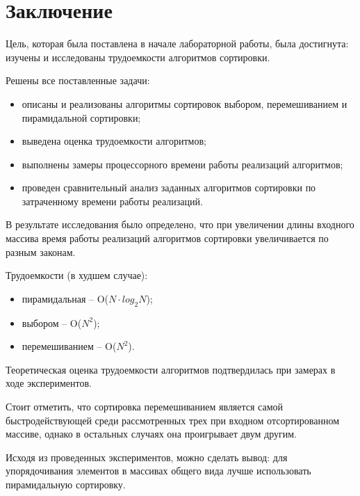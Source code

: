 \chapter*{Заключение}

Цель, которая была поставлена в начале лабораторной работы, была достигнута: изучены и исследованы трудоемкости алгоритмов сортировки.

Решены все поставленные задачи:

\begin{itemize}[label=---]
	\item описаны и реализованы алгоритмы сортировок выбором, перемешиванием и пирамидальной сортировки;
	\item выведена оценка трудоемкости алгоритмов;
    \item выполнены замеры процессорного времени работы реализаций алгоритмов;
	\item проведен сравнительный анализ заданных алгоритмов сортировки по затраченному времени работы реализаций.
\end{itemize}

В результате исследования было определено, что при увеличении длины входного массива время работы реализаций алгоритмов сортировки увеличивается по разным законам.

Трудоемкости (в худшем случае):
\begin{itemize}[label=---]
    \item пирамидальная -- O($N\cdot log_2N$);
    \item выбором -- O($N^2$);
    \item перемешиванием -- O($N^2$).
\end{itemize}

Теоретическая оценка трудоемкости алгоритмов подтвердилась при замерах в ходе экспериментов.

Стоит отметить, что сортировка перемешиванием является самой быстродействующей среди рассмотренных трех при входном отсортированном массиве, однако в остальных случаях она проигрывает двум другим. 

Исходя из проведенных экспериментов, можно сделать вывод: для упорядочивания элементов в массивах общего вида лучше использовать пирамидальную сортировку.